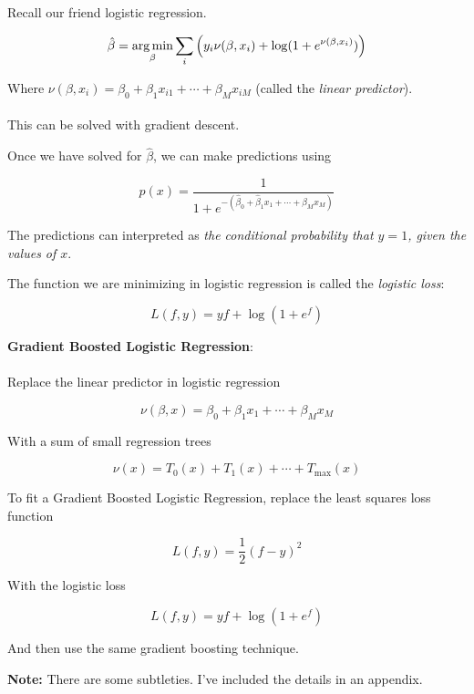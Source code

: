 %
\begin{frame}
Recall our friend logistic regression.

$$ \hat \beta = \operatorname*{arg\,min}_{\beta} \sum_i \left( y_i \nu(\beta, x_i) + \log(1 + e^{\nu(\beta, x_i)}) \right) $$

Where $\nu(\beta, x_i) = \beta_0 + \beta_1 x_{i1} + \cdots + \beta_{M} x_{iM}$ (called the \textit{linear predictor}).\\~\\

This can be solved with gradient descent.
\end{frame}
%
\begin{frame}
Once we have solved for $\hat \beta$, we can make predictions using

$$p(x) = \frac{1}{1 + e^{-(\hat \beta_0 + \hat \beta_1 x_1 + \cdots + \hat \beta_M x_M)}}$$

The predictions can interpreted as \textit{the conditional probability that $y = 1$, given the values of $x$}.
\end{frame}
%
\begin{frame}
The function we are minimizing in logistic regression is called the \textit{logistic loss}:

$$ L(f, y) = y f + \log(1 + e^{f}) $$

\end{frame}
%
\begin{frame}
\textbf{Gradient Boosted Logistic Regression}:\\~\\
Replace the linear predictor in logistic regression 

$$\nu(\beta, x) = \beta_0 + \beta_1 x_1 + \cdots + \beta_{M} x_M$$

With a sum of small regression trees

$$\nu(x) = T_0(x) + T_1(x) + \cdots + T_{\text{max}}(x)$$
\end{frame}
%
\begin{frame}
To fit a Gradient Boosted Logistic Regression, replace the least squares loss function

$$ L(f, y) = \frac{1}{2} \left(f - y \right)^2 $$

With the logistic loss

$$ L(f, y) = y f + \log(1 + e^f) $$

And then use the same gradient boosting technique.

\end{frame}
%
\begin{frame}
\textbf{Note:} There are some subtleties.  I've included the details in an appendix.
\end{frame}

